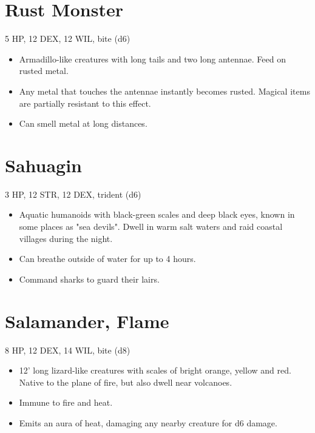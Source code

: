 \documentclass[
  10pt,
  american,
]{article}
\begin{document}
\hypertarget{rust-monster}{%
\section{Rust Monster}\label{rust-monster}}

5 HP, 12 DEX, 12 WIL, bite (d6)

\begin{samepage}
\begin{itemize}
\setlength\itemsep{-.5em}
\item Armadillo-like creatures with long tails and two long antennae. Feed on rusted metal.
\item Any metal that touches the antennae instantly becomes rusted. Magical items are partially resistant to this effect.
\item Can smell metal at long distances.
\end{itemize}
\end{samepage}

\hypertarget{sahuagin}{%
\section{Sahuagin}\label{sahuagin}}

3 HP, 12 STR, 12 DEX, trident (d6)

\begin{samepage}
\begin{itemize}
\setlength\itemsep{-.5em}
\item Aquatic humanoids with black-green scales and deep black eyes, known in some places as "sea devils". Dwell in warm salt waters and raid coastal villages during the night.
\item Can breathe outside of water for up to 4 hours.
\item Command sharks to guard their lairs.
\end{itemize}
\end{samepage}

\hypertarget{salamander-flame}{%
\section{Salamander, Flame}\label{salamander-flame}}

8 HP, 12 DEX, 14 WIL, bite (d8)

\begin{samepage}
\begin{itemize}
\setlength\itemsep{-.5em}
\item 12' long lizard-like creatures with scales of bright orange, yellow and red. Native to the plane of fire, but also dwell near volcanoes. 
\item Immune to fire and heat.
\item Emits an aura of heat, damaging any nearby creature for d6 damage.
\end{itemize}
\end{samepage}
\end{document}
